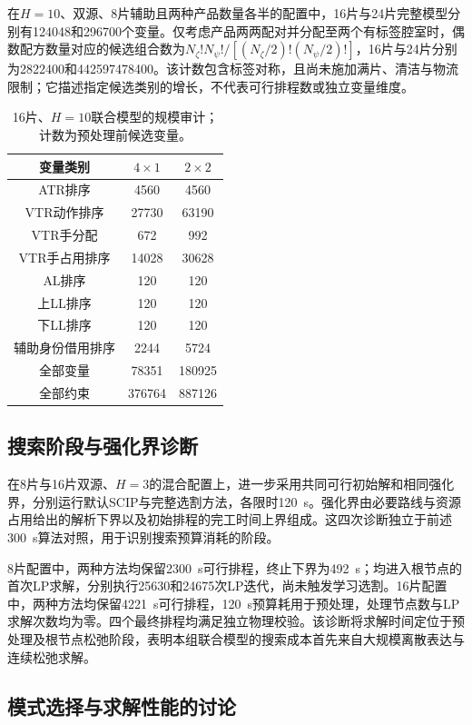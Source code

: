 \documentclass[final,5p,times,twocolumn]{elsarticle}
\begin{document}
在$H=10$、双源、8片辅助且两种产品数量各半的配置中，16片与24片完整模型分别有124048和296700个变量。仅考虑产品两两配对并分配至两个有标签腔室时，偶数配方数量对应的候选组合数为$N_{\zeta}!N_{\psi}!/[(N_{\zeta}/2)!(N_{\psi}/2)!]$，16片与24片分别为2822400和442597478400。该计数包含标签对称，且尚未施加满片、清洁与物流限制；它描述指定候选类别的增长，不代表可行排程数或独立变量维度。

\begin{table}[!t]\centering\scriptsize\setlength{\tabcolsep}{4pt}
\caption{16片、$H=10$联合模型的规模审计；计数为预处理前候选变量。}
\label{tab:order-audit-cn}
\begin{tabular}{ccc}\toprule
变量类别 & $4\times1$ & $2\times2$\\\midrule
ATR排序 & 4560 & 4560\\
VTR动作排序 & 27730 & 63190\\
VTR手分配 & 672 & 992\\
VTR手占用排序 & 14028 & 30628\\
AL排序 & 120 & 120\\
上LL排序 & 120 & 120\\
下LL排序 & 120 & 120\\
辅助身份借用排序 & 2244 & 5724\\
全部变量 & 78351 & 180925\\
全部约束 & 376764 & 887126\\
\bottomrule\end{tabular}\end{table}



\subsection{搜索阶段与强化界诊断}

在8片与16片双源、$H=3$的混合配置上，进一步采用共同可行初始解和相同强化界，分别运行默认SCIP与完整选割方法，各限时120~s。强化界由必要路线与资源占用给出的解析下界以及初始排程的完工时间上界组成。这四次诊断独立于前述300~s算法对照，用于识别搜索预算消耗的阶段。

8片配置中，两种方法均保留2300~s可行排程，终止下界为492~s；均进入根节点的首次LP求解，分别执行25630和24675次LP迭代，尚未触发学习选割。16片配置中，两种方法均保留4221~s可行排程，120~s预算耗用于预处理，处理节点数与LP求解次数均为零。四个最终排程均满足独立物理校验。该诊断将求解时间定位于预处理及根节点松弛阶段，表明本组联合模型的搜索成本首先来自大规模离散表达与连续松弛求解。

\subsection{模式选择与求解性能的讨论}
\end{document}
